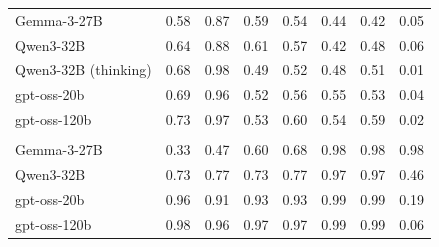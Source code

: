 \begin{tabular}{lccccccc}
Gemma-3-27B & 0.58 & 0.87 & 0.59 & 0.54 & 0.44 & 0.42 & 0.05 \\
Qwen3-32B & 0.64 & 0.88 & 0.61 & 0.57 & 0.42 & 0.48 & 0.06 \\
Qwen3-32B (thinking) & 0.68 & 0.98 & 0.49 & 0.52 & 0.48 & 0.51 & 0.01 \\
gpt-oss-20b & 0.69 & 0.96 & 0.52 & 0.56 & 0.55 & 0.53 & 0.04 \\
gpt-oss-120b & 0.73 & 0.97 & 0.53 & 0.60 & 0.54 & 0.59 & 0.02 \\
\addlinespace[2pt]
\multicolumn{8}{l}{\textit{LLM judges (errors prompt)}} \\
Gemma-3-27B & 0.33 & 0.47 & 0.60 & 0.68 & 0.98 & 0.98 & 0.98 \\
Qwen3-32B & 0.73 & 0.77 & 0.73 & 0.77 & 0.97 & 0.97 & 0.46 \\
gpt-oss-20b & 0.96 & 0.91 & 0.93 & 0.93 & 0.99 & 0.99 & 0.19 \\
gpt-oss-120b & 0.98 & 0.96 & 0.97 & 0.97 & 0.99 & 0.99 & 0.06 \\
\bottomrule
\end{tabular}